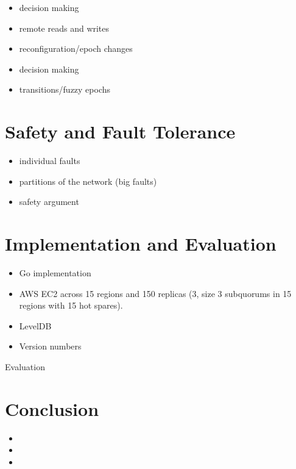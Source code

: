 \documentclass[10pt,twocolumn]{article}
\begin{document}
\begin{itemize}
    \item \sub decision making
    \item remote reads and writes
    \item reconfiguration/epoch changes
    \item \roo decision making
    \item transitions/fuzzy epochs
\end{itemize}

\section*{Safety and Fault Tolerance}

\begin{itemize}
    \item individual faults
    \item partitions of the network (big faults)
    \item safety argument
\end{itemize}

\section*{Implementation and Evaluation}

\begin{itemize}
    \item Go implementation
    \item AWS EC2 across 15 regions and 150 replicas (3, size 3 subquorums in 15 regions with 15 hot spares).
    \item LevelDB
    \item Version numbers
\end{itemize}

Evaluation

\section*{Conclusion}

\begin{itemize}
    \item {}
    \item {}
    \item {}
\end{itemize}



\end{document}
